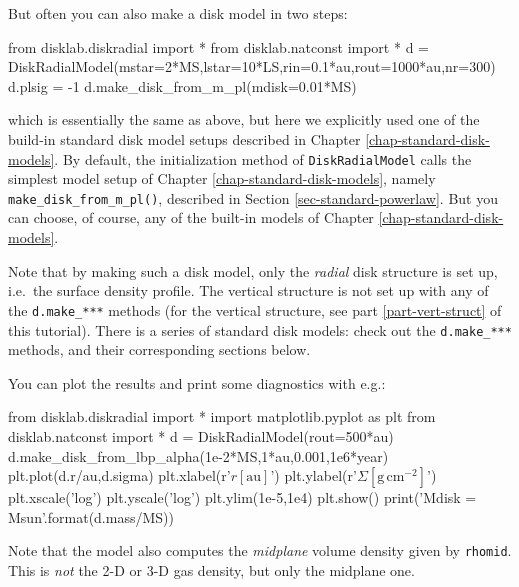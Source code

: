 \documentclass{book}
\newcommand{\code}[1]{{\small\tt #1}}
\begin{document}
But often you can also make a disk model in two steps:
\begin{codebox}
from disklab.diskradial import *
from disklab.natconst import *
d = DiskRadialModel(mstar=2*MS,lstar=10*LS,rin=0.1*au,rout=1000*au,nr=300)
d.plsig = -1
d.make_disk_from_m_pl(mdisk=0.01*MS)
\end{codebox}
\noindent which is essentially the same as above, but here we explicitly used
one of the build-in standard disk model setups described in Chapter
\ref{chap-standard-disk-models}. By default, the initialization method of
\code{DiskRadialModel} calls the simplest model setup of Chapter
\ref{chap-standard-disk-models}, namely \code{make\_disk\_from\_m\_pl()},
described in Section \ref{sec-standard-powerlaw}. But you can choose, of course,
any of the built-in models of Chapter \ref{chap-standard-disk-models}.

Note that by making such a disk model, only the {\em radial} disk structure is
set up, i.e.\ the surface density profile. The vertical structure is not set up
with any of the \code{d.make\_***} methods (for the vertical structure, see part
\ref{part-vert-struct} of this tutorial). There is a series of standard disk
models: check out the \code{d.make\_***} methods, and their corresponding
sections below.

You can plot the results and print some diagnostics with e.g.:
\begin{codebox}
from disklab.diskradial import *
import matplotlib.pyplot as plt
from disklab.natconst import *
d = DiskRadialModel(rout=500*au)
d.make_disk_from_lbp_alpha(1e-2*MS,1*au,0.001,1e6*year)
plt.plot(d.r/au,d.sigma)
plt.xlabel(r'$r [\mathrm{au}]$')
plt.ylabel(r'$\Sigma [\mathrm{g}\,\mathrm{cm}^{-2}]$')
plt.xscale('log')
plt.yscale('log')
plt.ylim(1e-5,1e4)
plt.show()
print('Mdisk = {} Msun'.format(d.mass/MS))
\end{codebox}

Note that the model also computes the {\em midplane} volume density
given by \code{rhomid}. This is {\em not} the 2-D or 3-D gas density,
but only the midplane one.
\end{document}
